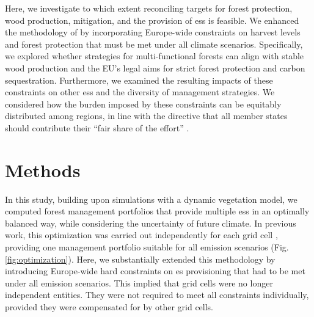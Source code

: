 \documentclass[]{article}
\begin{document}
Here, we investigate to which extent reconciling targets for forest protection, wood production, mitigation, and the provision of \glspl{es} is feasible. We enhanced the methodology of \textcite{Gregor2022} by incorporating Europe-wide constraints on harvest levels and forest protection that must be met under all climate scenarios. Specifically, we explored whether strategies for multi-functional forests can align with stable wood production and the EU's legal aims for strict forest protection and carbon sequestration. Furthermore, we examined the resulting impacts of these constraints on other \glspl{es} and the diversity of management strategies. We considered how the burden imposed by these constraints can be equitably distributed among regions, in line with the directive that all member states should contribute their ``fair share of the effort'' \parencite{EuropeanCommissionBiodivStrat2020}.










\section{Methods}

\glsresetall


In this study, building upon simulations with a dynamic vegetation model, we computed forest management portfolios that provide multiple \glspl{es} in an optimally balanced way, while considering the uncertainty of future climate.
In previous work, this optimization was carried out independently for each grid cell \parencite{Gregor2022}, providing one management portfolio suitable for all emission scenarios (Fig. \ref{fig:optimization}).
Here, we substantially extended this methodology by introducing Europe-wide hard constraints on \gls{es} provisioning that had to be met under all emission scenarios. This implied that grid cells were no longer independent entities. They were not required to meet all constraints individually, provided they were compensated for by other grid cells.
\end{document}
